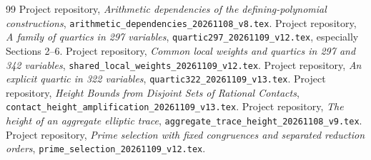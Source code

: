 \documentclass[11pt,a4paper]{article}
\begin{document}
\begin{thebibliography}{99}
 Project repository,
\emph{Arithmetic dependencies of the defining-polynomial constructions},
\nolinkurl{arithmetic_dependencies_20261108_v8.tex}.
 Project repository,
\emph{A family of quartics in 297 variables},
\nolinkurl{quartic297_20261109_v12.tex}, especially Sections 2--6.
 Project repository,
\emph{Common local weights and quartics in 297 and 342 variables},
\nolinkurl{shared_local_weights_20261109_v12.tex}.
 Project repository,
\emph{An explicit quartic in 322 variables},
\nolinkurl{quartic322_20261109_v13.tex}.
 Project repository,
\emph{Height Bounds from Disjoint Sets of Rational Contacts},
\nolinkurl{contact_height_amplification_20261109_v13.tex}.
 Project repository,
\emph{The height of an aggregate elliptic trace},
\nolinkurl{aggregate_trace_height_20261108_v9.tex}.
 Project repository,
\emph{Prime selection with fixed congruences and separated reduction orders},
\nolinkurl{prime_selection_20261109_v12.tex}.
\end{thebibliography}
\end{document}
